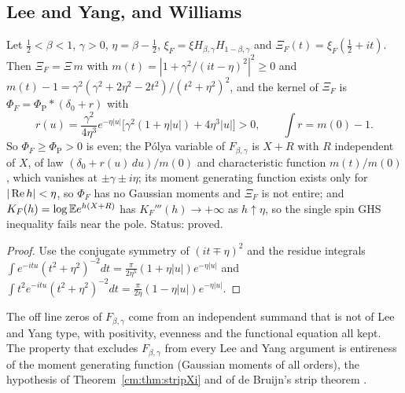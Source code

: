 \subsection*{Lee and Yang, and Williams}

\begin{proposition}\label{rg:prop:FPolya}
Let $\frac12<\beta<1$, $\gamma>0$, $\eta=\beta-\frac12$, $\xi_F=\xi H_{\beta,\gamma}H_{1-\beta,\gamma}$ and $\Xi_F(t)=\xi_F(\frac12+it)$. Then $\Xi_F=\Xi\,m$ with $m(t)=|1+\gamma^2/(it-\eta)^2|^2\ge0$ and $m(t)-1=\gamma^2(\gamma^2+2\eta^2-2t^2)/(t^2+\eta^2)^2$, and the kernel of $\Xi_F$ is $\Phi_F=\Phi_{\mathrm P}*(\delta_0+r)$ with
\[r(u)=\frac{\gamma^2}{4\eta^3}e^{-\eta|u|}\big[\gamma^2(1+\eta|u|)+4\eta^3|u|\big]>0,\qquad\int r=m(0)-1.\]
So $\Phi_F\ge\Phi_{\mathrm P}>0$ is even; the P\'olya variable of $F_{\beta,\gamma}$ is $X+R$ with $R$ independent of $X$, of law $(\delta_0+r(u)\,du)/m(0)$ and characteristic function $m(t)/m(0)$, which vanishes at $\pm\gamma\pm i\eta$; its moment generating function exists only for $|\operatorname{Re} h|<\eta$, so $\Phi_F$ has no Gaussian moments and $\Xi_F$ is not entire; and $K_F(h)=\log\mathbb{E} e^{h(X+R)}$ has $K_F'''(h)\to+\infty$ as $h\uparrow\eta$, so the single spin GHS inequality fails near the pole. Status: proved.
\end{proposition}

\begin{proof}
Use the conjugate symmetry of $(it\mp\eta)^2$ and the residue integrals $\int e^{-itu}(t^2+\eta^2)^{-2}dt=\frac\pi{2\eta^3}(1+\eta|u|)e^{-\eta|u|}$ and $\int t^2e^{-itu}(t^2+\eta^2)^{-2}dt=\frac\pi{2\eta}(1-\eta|u|)e^{-\eta|u|}$.
\end{proof}

The off line zeros of $F_{\beta,\gamma}$ come from an independent summand that is not of Lee and Yang type, with positivity, evenness and the functional equation all kept. The property that excludes $F_{\beta,\gamma}$ from every Lee and Yang argument is entireness of the moment generating function (Gaussian moments of all orders), the hypothesis of Theorem~\ref{cm:thm:stripXi} and of de Bruijn's strip theorem \cite{deBruijn}.

